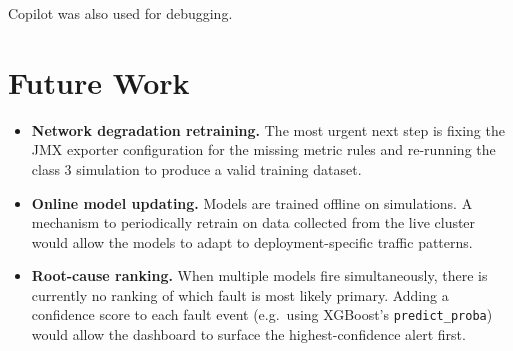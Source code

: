 \documentclass[12pt, a4paper]{article}
\begin{document}
Copilot was also used for debugging.

\section{Future Work}

\begin{itemize}
    \item \textbf{Network degradation retraining.} The most urgent next step is
          fixing the JMX exporter configuration for the missing metric rules and
          re-running the class 3 simulation to produce a valid training dataset.
    \item \textbf{Online model updating.} Models are trained offline on
          simulations. A mechanism to periodically retrain on data collected from
          the live cluster would allow the models to adapt to deployment-specific
          traffic patterns.

    \item \textbf{Root-cause ranking.} When multiple models fire simultaneously,
          there is currently no ranking of which fault is most likely primary.
          Adding a confidence score to each fault event (e.g.\ using XGBoost's
          \texttt{predict\_proba}) would allow the dashboard to surface the
          highest-confidence alert first.
\end{itemize}
\end{document}
